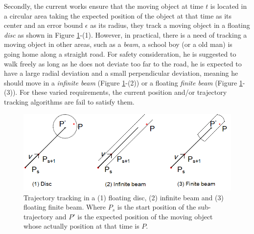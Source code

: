 Secondly, the current works ensure that the moving object at time $t$ is located in a circular area taking the expected position of the object at that time as its center and an error bound $\epsilon$ as its radius, \ie they track a moving object in a floating \emph{disc} as shown in Figure \ref{fig:areas}-(1). 
%
However, in practical, there is a need of tracking a moving object in other areas, such as a \emph{beam}, \eg a school boy (or a old man) is going home along a straight road. For safety consideration, he is suggested to walk freely as long as he does not deviate too far to the road, \ie he is expected to have a large radial deviation and a small perpendicular deviation, meaning he should move in a \emph{infinite beam} \cite{Chen:Space,Daescu:metric} (Figure \ref{fig:areas}-(2)) or a floating \emph{finite beam} (Figure \ref{fig:areas}-(3)).
For these varied requirements, the current position and/or trajectory tracking algorithms are fail to satisfy them.


\begin{figure}[tb!]
	\centering
	\includegraphics[scale=1.0]{Figures/Fig-Areas.png}\vspace{-1ex}
	\vspace{-1ex}
	\caption{\small  Trajectory tracking in a (1) floating disc, (2) infinite beam and (3) floating finite beam. Where $P_s$ is the start position of the sub-trajectory and $P'$ is the expected position of the moving object whose actually position at that time is $P$.}
	\vspace{-1ex}
	\label{fig:areas}
\end{figure}

